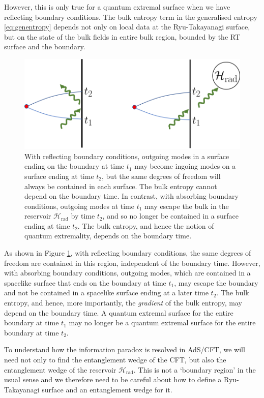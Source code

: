 \documentclass[11pt,a4paper]{article}
\begin{document}
However, this is only true for a quantum extremal surface when we have reflecting boundary conditions. The bulk entropy term in the generalised entropy \eqref{eq:genentropy} depends not only on local data at the Ryu-Takayanagi surface, but on the state of the bulk fields in entire bulk region, bounded by the RT surface and the boundary.  
\begin{figure}[t]
\includegraphics[width = 0.5\linewidth]{TimeDependence.png}
\centering
\caption{With reflecting boundary conditions, outgoing modes in a surface ending on the boundary at time $t_1$ may become ingoing modes on a surface ending at time $t_2$, but the same degrees of freedom will always be contained in each surface. The bulk entropy cannot depend on the boundary time. In contrast, with absorbing boundary conditions, outgoing modes at time $t_1$ may escape the bulk in the reservoir $\mathcal{H}_\text{rad}$ by time $t_2$, and so no longer be contained in a surface ending at time $t_2$. The bulk entropy, and hence the notion of quantum extremality, depends on the boundary time.}
\label{fig:bcs}
\end{figure}

As shown in Figure \ref{fig:bcs}, with reflecting boundary conditions, the same degrees of freedom are contained in this region, independent of the boundary time. However, with absorbing boundary conditions, outgoing modes, which are contained in a spacelike surface that ends on the boundary at time $t_1$, may escape the boundary and not be contained in a spacelike surface ending at a later time $t_2$. The bulk entropy, and hence, more importantly, the \emph{gradient} of the bulk entropy, may depend on the boundary time. A quantum extremal surface for the entire boundary at time $t_1$ may no longer be a quantum extremal surface for the entire boundary at time $t_2$. 

To understand how the information paradox is resolved in AdS/CFT, we will need not only to find the entanglement wedge of the CFT, but also the entanglement wedge of the reservoir $\mathcal{H}_\text{rad}$. This is not a `boundary region' in the usual sense and we therefore need to be careful about how to define a Ryu-Takayanagi surface and an entanglement wedge for it. 
\end{document}
